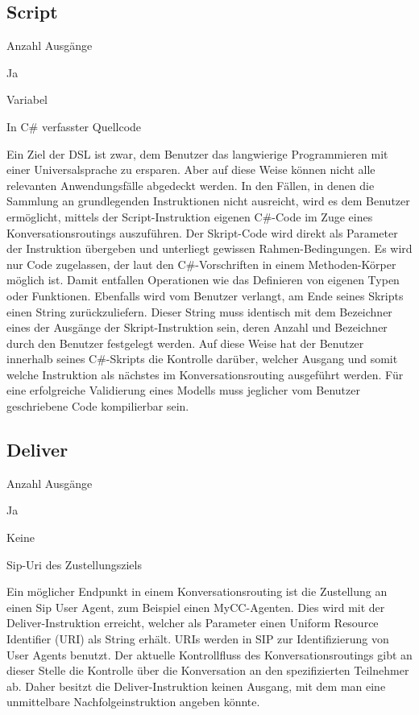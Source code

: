 \subsection{Script}
\label{subsec:Script}
\begin{labeling}{Anzahl Ausgänge}
\item [Eingang] Ja
\item [Anzahl Ausgänge] Variabel
\item [Parameter] In C\# verfasster Quellcode
\item [Beschreibung] Ein Ziel der DSL ist zwar, dem Benutzer das langwierige Programmieren mit einer Universalsprache zu ersparen. Aber auf diese Weise können nicht alle relevanten Anwendungsfälle abgedeckt werden. In den Fällen, in denen die Sammlung an grundlegenden Instruktionen nicht ausreicht, wird es dem Benutzer ermöglicht, mittels der Script-Instruktion eigenen C\#-Code im Zuge eines Konversationsroutings auszuführen. Der Skript-Code wird direkt als Parameter der Instruktion übergeben und unterliegt gewissen Rahmen-Bedingungen. Es wird nur Code zugelassen, der laut den C\#-Vorschriften in einem Methoden-Körper möglich ist. Damit entfallen Operationen wie das Definieren von eigenen Typen oder Funktionen. Ebenfalls wird vom Benutzer verlangt, am Ende seines Skripts einen String zurückzuliefern. Dieser String muss identisch mit dem Bezeichner eines der Ausgänge der Skript-Instruktion sein, deren Anzahl und Bezeichner durch den Benutzer festgelegt werden. Auf diese Weise hat der Benutzer innerhalb seines C\#-Skripts die Kontrolle darüber, welcher Ausgang und somit welche Instruktion als nächstes im Konversationsrouting ausgeführt werden. Für eine erfolgreiche Validierung eines Modells muss jeglicher vom Benutzer geschriebene Code kompilierbar sein.   
\end{labeling}

\subsection{Deliver}
\label{subsec:Deliver}
\begin{labeling}{Anzahl Ausgänge}
\item [Eingang] Ja
\item [Anzahl Ausgänge] Keine
\item [Parameter] Sip-Uri des Zustellungsziels
\item [Beschreibung] Ein möglicher Endpunkt in einem Konversationsrouting ist die Zustellung an einen Sip User Agent, zum Beispiel einen MyCC-Agenten. Dies wird mit der Deliver-Instruktion erreicht, welcher als Parameter einen Uniform Resource Identifier (URI) als String erhält. URIs werden in SIP zur Identifizierung von User Agents benutzt. Der aktuelle Kontrollfluss des Konversationsroutings gibt an dieser Stelle die Kontrolle über die Konversation an den spezifizierten Teilnehmer ab. Daher besitzt die Deliver-Instruktion keinen Ausgang, mit dem man eine unmittelbare Nachfolgeinstruktion angeben könnte.
\end{labeling}

